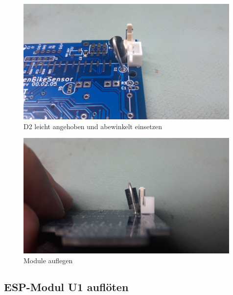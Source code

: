 \documentclass[12pt, a4paper]{article}		%
\begin{document}
\begin{minipage}[t]{0.49\textwidth}
\begin{figure}[H]
	\centering
		\includegraphics[width=0.99\textwidth]{Grafiken/20200922_190049.jpg}
	\caption{D2 leicht angehoben und abewinkelt einsetzen}
	\label{fig:}
\end{figure}
\end{minipage}
\begin{minipage}[t]{0.49\textwidth}
\begin{figure}[H]
	\centering
		\includegraphics[width=0.99\textwidth]{Grafiken/20200922_190101.jpg}
	\caption{Module auflegen}
	\label{fig:20200922_190101}
\end{figure}
\end{minipage}

\subsection{ESP-Modul U1 auflöten}
\end{document}

